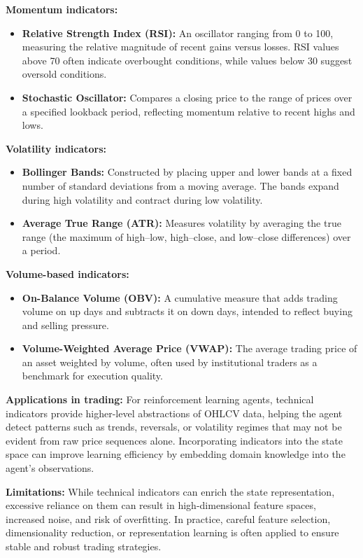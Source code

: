 \documentclass[12pt,a4paper]{report}
\begin{document}
\bigskip
\textbf{Momentum indicators:}
\begin{itemize}
    \item \textbf{Relative Strength Index (RSI):} An oscillator ranging from 0 to 100, measuring the relative magnitude of recent gains versus losses. RSI values above 70 often indicate overbought conditions, while values below 30 suggest oversold conditions.
    \item \textbf{Stochastic Oscillator:} Compares a closing price to the range of prices over a specified lookback period, reflecting momentum relative to recent highs and lows.
\end{itemize}

\bigskip
\textbf{Volatility indicators:}
\begin{itemize}
    \item \textbf{Bollinger Bands:} Constructed by placing upper and lower bands at a fixed number of standard deviations from a moving average. The bands expand during high volatility and contract during low volatility.
    \item \textbf{Average True Range (ATR):} Measures volatility by averaging the true range (the maximum of high–low, high–close, and low–close differences) over a period.
\end{itemize}

\bigskip
\textbf{Volume-based indicators:}
\begin{itemize}
    \item \textbf{On-Balance Volume (OBV):} A cumulative measure that adds trading volume on up days and subtracts it on down days, intended to reflect buying and selling pressure.
    \item \textbf{Volume-Weighted Average Price (VWAP):} The average trading price of an asset weighted by volume, often used by institutional traders as a benchmark for execution quality.
\end{itemize}

\bigskip
\textbf{Applications in trading:}  
For reinforcement learning agents, technical indicators provide higher-level abstractions of OHLCV data, helping the agent detect patterns such as trends, reversals, or volatility regimes that may not be evident from raw price sequences alone. Incorporating indicators into the state space can improve learning efficiency by embedding domain knowledge into the agent’s observations. 

\bigskip
\textbf{Limitations:}  
While technical indicators can enrich the state representation, excessive reliance on them can result in high-dimensional feature spaces, increased noise, and risk of overfitting. In practice, careful feature selection, dimensionality reduction, or representation learning is often applied to ensure stable and robust trading strategies.
\end{document}
